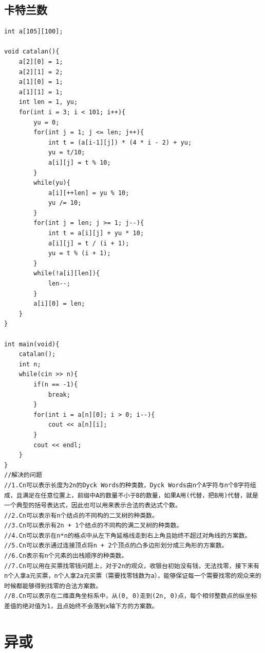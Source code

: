 \documentclass[twoside]{article}
\begin{document}
\subsection{卡特兰数}
\begin{lstlisting}
int a[105][100];

void catalan(){
    a[2][0] = 1;
    a[2][1] = 2;
    a[1][0] = 1;
    a[1][1] = 1;
    int len = 1, yu;
    for(int i = 3; i < 101; i++){
        yu = 0;
        for(int j = 1; j <= len; j++){
            int t = (a[i-1][j]) * (4 * i - 2) + yu;
            yu = t/10;
            a[i][j] = t % 10;
        }
        while(yu){
            a[i][++len] = yu % 10;
            yu /= 10;
        }
        for(int j = len; j >= 1; j--){
            int t = a[i][j] + yu * 10;
            a[i][j] = t / (i + 1);
            yu = t % (i + 1);
        }
        while(!a[i][len]){
            len--;
        }
        a[i][0] = len;
    }
}

int main(void){
    catalan();
    int n;
    while(cin >> n){
        if(n == -1){
            break;
        }
        for(int i = a[n][0]; i > 0; i--){
            cout << a[n][i];
        }
        cout << endl;
    }
}
//解决的问题
//1.Cn可以表示长度为2n的Dyck Words的种类数，Dyck Words由n个A字符与n个B字符组成，且满足在任意位置上，前缀中A的数量不小于B的数量，如果A用(代替，把B用)代替，就是一个典型的括号表达式，因此也可以用来表示合法的表达式个数。
//2.Cn可以表示有n个结点的不同构的二叉树的种类数。
//3.Cn可以表示有2n + 1个结点的不同构的满二叉树的种类数。
//4.Cn可以表示在n*n的格点中从左下角延格线走到右上角且始终不超过对角线的方案数。
//5.Cn可以表示通过连接顶点将n + 2个顶点的凸多边形划分成三角形的方案数。
//6.Cn表示有n个元素的出栈顺序的种类数。
//7.Cn可以用在买票找零钱问题上，对于2n的观众，收银台初始没有钱，无法找零，接下来有n个人拿a元买票，n个人拿2a元买票（需要找零钱数为a），能够保证每一个需要找零的观众来的时候都能够得到找零的合法方案数。
//8.Cn可以表示在二维直角坐标系中，从(0, 0)走到(2n, 0)点，每个相邻整数点的纵坐标差值的绝对值为1，且点始终不会落到x轴下方的方案数。\end{lstlisting}
\clearpage\section{异或}
\end{document}
